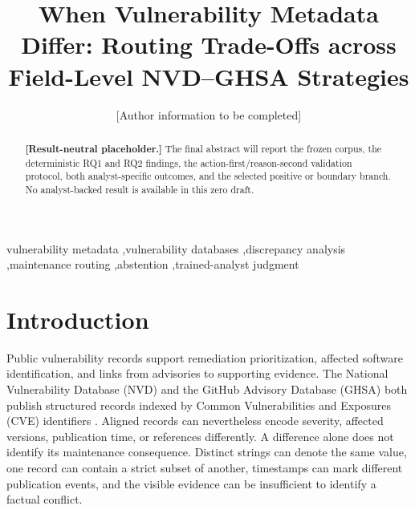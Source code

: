 \documentclass[preprint,review,12pt,authoryear]{elsarticle}
\begin{document}
\begin{frontmatter}

\title{When Vulnerability Metadata Differ: Routing Trade-Offs across Field-Level NVD--GHSA Strategies}

\author{[Author information to be completed]}

\begin{abstract}
\textbf{[Result-neutral placeholder.]}
The final abstract will report the frozen corpus, the deterministic RQ1 and RQ2
findings, the action-first/reason-second validation protocol, both
analyst-specific outcomes, and the selected positive or boundary branch. No
analyst-backed result is available in this zero draft.
\end{abstract}

\begin{keyword}
vulnerability metadata \sep vulnerability databases \sep discrepancy analysis
\sep maintenance routing \sep abstention \sep trained-analyst judgment
\end{keyword}

\end{frontmatter}

\section{Introduction}
\label{sec:introduction}

Public vulnerability records support remediation prioritization, affected
software identification, and links from advisories to supporting evidence. The
National Vulnerability Database (NVD) and the GitHub Advisory Database (GHSA)
both publish structured records indexed by Common Vulnerabilities and Exposures
(CVE) identifiers \citep{NVDDevelopers2026,GitHubAdvisoryDatabase2026}. Aligned
records can nevertheless encode severity, affected versions, publication time,
or references differently. A difference alone does not identify its
maintenance consequence. Distinct strings can denote the same value, one record
can contain a strict subset of another, timestamps can mark different
publication events, and the visible evidence can be insufficient to identify a
factual conflict.
\end{document}
